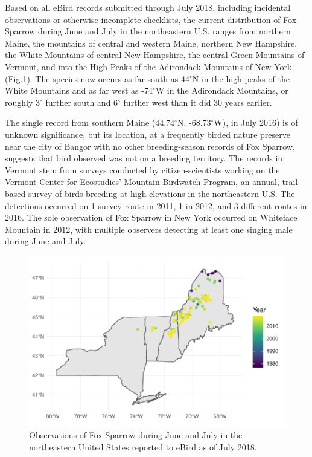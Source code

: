 \documentclass[fleqn,10pt,lineno]{wlpeerj} %
\begin{document}
Based on all eBird records submitted through July 2018, including incidental observations or otherwise incomplete checklists, the current distribution of Fox Sparrow during June and July in the northeastern U.S. ranges from northern Maine, the mountains of central and western Maine, northern New Hampshire, the White Mountains of central New Hampshire, the central Green Mountains of Vermont, and into the High Peaks of the Adirondack Mountains of New York (Fig.\ref{fig:Figure1}). The species now occurs as far south as 44$^{\circ}$N in the high peaks of the White Mountains and as far west as -74$^{\circ}$W in the Adirondack Mountains, or roughly 3$^{\circ}$ further south and 6$^{\circ}$ further west than it did 30 years earlier.

The single record from southern Maine (44.74$^{\circ}$N, -68.73$^{\circ}$W), in July 2016) is of unknown significance, but its location, at a frequently birded nature preserve near the city of Bangor with no other breeding-season records of Fox Sparrow, suggests that bird observed was not on a breeding territory. The records in Vermont stem from surveys conducted by citizen-scientists working on the Vermont Center for Ecostudies’ Mountain Birdwatch Program, an annual, trail-based survey of birds breeding at high elevations in the northeastern U.S. The detections occurred on 1 survey route in 2011, 1 in 2012, and 3 different routes in 2016. The sole observation of Fox Sparrow in New York occurred on Whiteface Mountain in 2012, with multiple observers detecting at least one singing male during June and July. 

\begin{figure}[ht]\centering
\includegraphics[width=\linewidth]{Figure1}
\caption{Observations of Fox Sparrow during June and July in the northeastern United States reported to eBird as of July 2018.}
\label{fig:Figure1}
\end{figure}
\end{document}
